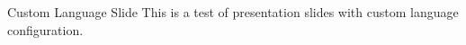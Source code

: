 \documentclass[14pt,t,lang=en-GB]{beamer-accessibility}
\begin{document}
\begin{frame}{Custom Language Slide}
This is a test of presentation slides with custom language configuration.
\end{frame}
\end{document}
